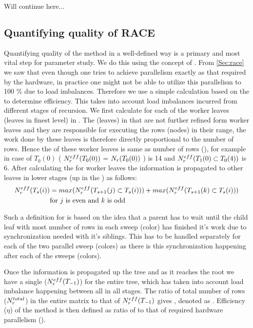 {\GW Will continue here...}

\subsection{Quantifying quality of RACE}
Quantifying quality of the method in a well-defined way is a primary and most vital step for parameter study. We do this using the concept of \effPar. From \cref{Sec:race} we saw that even though one tries to achieve parallelism exactly as that required by the hardware, in practice one might not be able to utilize this parallelism to 100 \% due to load imbalances. Therefore we use a simple calculation based on the \levelTree to determine efficiency. This takes into account load imbalances incurred from different stages of recursion. We first calculate \effRow for each of the worker leaves (leaves in finest level) in \levelTree.
The \levelGroups (leaves) in \levelTree that are not further refined form worker leaves and they are responsible for executing the rows (nodes) in their range, the work done by these leaves is therefore directly proportional to the number of rows. Hence the \effRow of these worker leaves is same as number of rows (\nrows), for example in case of $T_0(0)$ \effRow ( $N_{r}^{eff}(T_0(0))$ = $N_{r}(T_0(0))$ ) is 14 and $N_{r}^{eff}(T_1(0) \subset T_0(4))$ is 6. After calculating the \effRow for worker leaves the information is propagated to other leaves in lower stages (up in the \levelTree) as follows: 
\begin{align*}
N_{r}^{eff}(T_s(i)) &= max(N_{r}^{eff}(T_{s+1}(j) \subset T_s(i))) + max(N_{r}^{eff}(T_{s+1}(k) \subset T_s(i)))\\
 & \text{for } j \text{ is even and } k \text{ is odd}
\end{align*}

Such a definition for \effRow is based on the idea that a parent has to wait until the child leaf with most number of rows in each sweep (color) has finished it's work due to synchronization needed with it's siblings. This has to be handled separately for each of the two parallel sweep (colors) as there is this synchronization happening after each of the sweeps (colors). 

Once the information is propagated up the tree and as it reaches the root we have a single \effRow ($N_{r}^{eff}(T_{-1})$) for the entire tree, which has taken into account load imbalance happening between all \levelGroups in all stages. The ratio of total number of rows ($N_{r}^{total}$) in the entire matrix to that of $N_{r}^{eff}(T_{-1})$ gives \effPar, denoted as \threadEff. Efficiency ($\eta$) of the method is then defined as ratio of  \threadEff to that of required hardware parallelism (\nthreads). 

